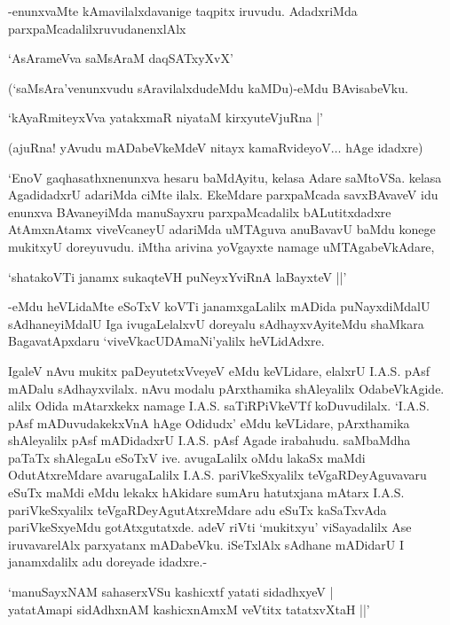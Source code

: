-enunxvaMte kAmavilalxdavanige taqpitx iruvudu. AdadxriMda parxpaMcadalilxruvudanenxlAlx

\begin{shloka}
`AsArameVva saMsAraM daqSATxyXvX'
\end{shloka}

(`saMsAra'venunxvudu sAravilalxdudeMdu kaMDu)-eMdu BAvisabeVku.

\begin{shloka}
`kAyaRmiteyxVva yatakxmaR niyataM kirxyuteV\s juRna |'
\end{shloka}

(ajuRna! yAvudu mADabeVkeMdeV nitayx kamaRvideyoV$\ldots$ hAge idadxre)

`EnoV gaqhasathxnenunxva hesaru baMdAyitu, kelasa Adare saMtoVSa. kelasa AgadidadxrU adariMda ciMte ilalx. EkeMdare parxpaMcada savxBAvaveV idu enunxva BAvaneyiMda manuSayxru parxpaMcadalilx bALutitxdadxre AtAmxnAtamx viveVcaneyU adariMda uMTAguva anuBavavU baMdu konege mukitxyU doreyuvudu. iMtha arivina yoVgayxte namage uMTAgabeVkAdare,

\begin{shloka}
`shatakoVTi janamx sukaqteVH puNeyxYviRnA laBayxteV ||'
\end{shloka}

-eMdu heVLidaMte eSoTxV koVTi janamxgaLalilx mADida puNayxdiMdalU sAdhaneyiMdalU Iga ivugaLelalxvU doreyalu sAdhayxvAyiteMdu shaMkara BagavatApxdaru `viveVkacUDAmaNi'yalilx heVLidAdxre.

IgaleV nAvu mukitx paDeyutetxVveyeV eMdu keVLidare, elalxrU {\eng I.A.S.} pAsf mADalu sAdhayxvilalx. nAvu modalu pArxthamika shAleyalilx OdabeVkAgide. alilx Odida mAtarxkekx namage {\eng I.A.S.} saTiRPiVkeVTf koDuvudilalx. `{\eng I.A.S.} pAsf mADuvudakekxVnA hAge Odidudx' eMdu keVLidare, pArxthamika shAleyalilx pAsf mADidadxrU {\eng I.A.S.} pAsf Agade irabahudu. saMbaMdha paTaTx shAlegaLu eSoTxV ive. avugaLalilx oMdu lakaSx maMdi OdutAtxreMdare avarugaLalilx {\eng I.A.S.} pariVkeSxyalilx teVgaRDeyAguvavaru eSuTx maMdi eMdu lekakx hAkidare sumAru hatutxjana mAtarx {\eng I.A.S.} pariVkeSxyalilx teVgaRDeyAgutAtxreMdare adu eSuTx kaSaTxvAda pariVkeSxyeMdu gotAtxgutatxde. adeV riVti `mukitxyu' viSayadalilx Ase iruvavarelAlx parxyatanx mADabeVku. iSeTxlAlx sAdhane mADidarU I janamxdalilx adu doreyade idadxre.-

\begin{shloka}
`manuSayxNAM sahaserxVSu kashicxtf yatati sidadhxyeV |\\
yatatAmapi sidAdhxnAM kashicxnAmxM veVtitx tatatxvXtaH ||'
\end{shloka}

